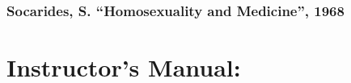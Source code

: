 \begin{refsection}
\begin{appendices}
\label{app: DSMII}


\section{Socarides, S. ``Homosexuality and Medicine'', 1968}
\label{socaridess.homosexualityandmedicine1968}

\label{app: DSMII}


\end{appendices}
\end{refsection}

\pagebreak 


\frontmatter 

\part{Instructor's Manual:}
\label{instructorsmanual:}


